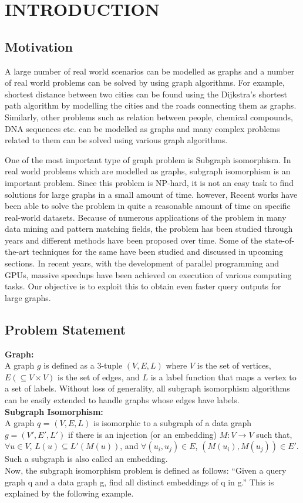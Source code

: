 \chapter{INTRODUCTION}
\label{chap:intro}


\section{Motivation}
A large number of real world scenarios can be modelled as graphs and a number of real world problems can be solved by using graph algorithms. For example, shortest distance between two cities can be found using the Dijkstra’s shortest path algorithm by modelling the cities and the roads connecting them as graphs. Similarly, other problems such as relation between people, chemical compounds, DNA sequences etc. can be modelled as graphs and many complex problems related to them can be solved using various graph algorithms. 

One of the most important type of graph problem is Subgraph isomorphism. In real world problems which are modelled as graphs, subgraph isomorphism is an important problem. Since this problem is NP-hard, it is not an easy task to find solutions for large graphs in a small amount of time. however, Recent works have been able to solve the problem in quite a reasonable amount of time on specific real-world datasets. Because of numerous applications of the problem in many data mining and pattern matching fields, the problem has been studied through years and different methods have been proposed over time. Some of the state-of-the-art techniques for the same have been studied and discussed in upcoming sections. In recent years, with the development of parallel programming and GPUs, massive speedups have been achieved on execution of various computing tasks. Our objective is to exploit this to obtain even faster query outputs for large graphs.

\section{Problem Statement}

\textbf{Graph:}\\
A graph $g$ is defined as a 3-tuple $(V,E,L)$ where $V$ is the set of vertices, $E(\subseteq V \times V)$ is the set of edges, and $L$ is a label function that maps a vertex to a set of labels. Without loss of generality, all subgraph isomorphism algorithms can be easily extended to handle graphs whose edges have labels.\\
\textbf{Subgraph Isomorphism:}\\
A graph $q$ = $(V, E,L)$ is isomorphic to a subgraph of a data graph $g = (V', E', L')$ if there is an injection (or an embedding) $M : V \rightarrow V$ such that, $\forall u \in V $, $L(u) \subseteq L' (M(u))$, and $\forall (u_i, u_j) \in E$, $(M(u_i), M(u_j)) \in E'$. Such a subgraph is also called an embedding.\\
Now, the subgraph isomorphism problem is defined as follows: “Given a query graph q and a data graph g, find all distinct embeddings of q in g.” This is explained by the following example.

